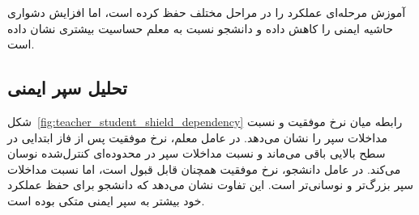 آموزش مرحله‌ای عملکرد را در مراحل مختلف حفظ کرده است، اما افزایش دشواری حاشیه ایمنی را کاهش داده و دانشجو نسبت به معلم حساسیت بیشتری نشان داده است.

\subsection{تحلیل سپر ایمنی}
\label{subsec:shield_analysis}

شکل~\ref{fig:teacher_student_shield_dependency} رابطه میان نرخ موفقیت و نسبت مداخلات سپر را نشان می‌دهد. در عامل معلم، نرخ موفقیت پس از فاز ابتدایی در سطح بالایی باقی می‌ماند و نسبت مداخلات سپر در محدوده‌ای کنترل‌شده نوسان می‌کند. در عامل دانشجو، نرخ موفقیت همچنان قابل قبول است، اما نسبت مداخلات سپر بزرگ‌تر و نوسانی‌تر است. این تفاوت نشان می‌دهد که دانشجو برای حفظ عملکرد خود بیشتر به سپر ایمنی متکی بوده است.

